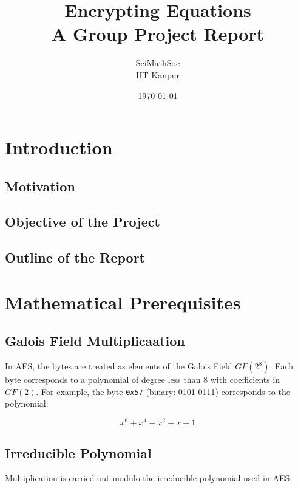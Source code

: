 \documentclass[12pt,a4paper]{report}
\begin{document}
\title{
    \Huge\bfseries Encrypting Equations\\[1em]
    \large A Group Project Report
}
\author{SciMathSoc
\vspace{1em}\\IIT Kanpur}
\date{\today}


\maketitle
\thispagestyle{empty}
\clearpage

\tableofcontents
\clearpage

\chapter{Introduction}
\section{Motivation}
\section{Objective of the Project}
\section{Outline of the Report}

\chapter{Mathematical Prerequisites}

\section{Galois Field Multiplicaation}
In AES, the bytes are treated as elements of the Galois Field \( GF(2^8) \). Each byte corresponds to a polynomial of degree less than 8 with coefficients in \( GF(2) \). For example, the byte \texttt{0x57} (binary: 0101 0111) corresponds to the polynomial:

\[
x^6 + x^4 + x^2 + x + 1
\]

\section*{Irreducible Polynomial}

Multiplication is carried out modulo the irreducible polynomial used in AES:
\end{document}
